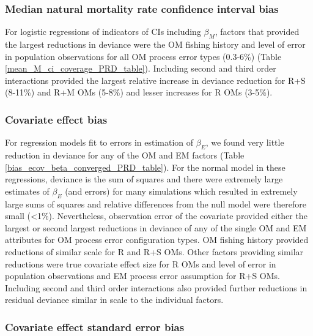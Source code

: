 \documentclass[
  12pt,
]{article}
\begin{document}
\subsubsection*{Median natural mortality rate confidence interval
bias}\label{median-natural-mortality-rate-confidence-interval-bias}

For logistic regressions of indicators of CIs including \(\beta_M\),
factors that provided the largest reductions in deviance were the OM
fishing history and level of error in population observations for all OM
process error types (0.3-6\%) (Table
\ref{mean_M_ci_coverage_PRD_table}). Including second and third order
interactions provided the largest relative increase in deviance
reduction for R+S (8-11\%) and R+M OMs (5-8\%) and lesser increases for
R OMs (3-5\%).

\subsubsection*{Covariate effect bias}\label{covariate-effect-bias}

For regression models fit to errors in estimation of \(\beta_E\), we
found very little reduction in deviance for any of the OM and EM factors
(Table \ref{bias_ecov_beta_converged_PRD_table}). For the normal model
in these regressions, deviance is the sum of squares and there were
extremely large estimates of \(\beta_E\) (and errors) for many
simulations which resulted in extremely large sums of squares and
relative differences from the null model were therefore small
(\textless1\%). Nevertheless, observation error of the covariate
provided either the largest or second largest reductions in deviance of
any of the single OM and EM attributes for OM process error
configuration types. OM fishing history provided reductions of similar
scale for R and R+S OMs. Other factors providing similar reductions were
true covariate effect size for R OMs and level of error in population
observations and EM process error assumption for R+S OMs. Including
second and third order interactions also provided further reductions in
residual deviance similar in scale to the individual factors.

\subsubsection*{Covariate effect standard error
bias}\label{covariate-effect-standard-error-bias}
\end{document}
